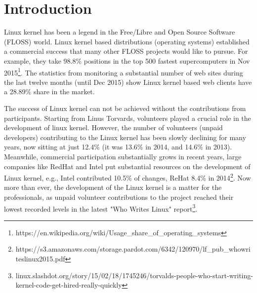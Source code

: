 \documentclass{sig-alternate-05-2015}
\begin{document}
\section{Introduction}

Linux kernel has been a legend in the Free/Libre and Open Source Software (FLOSS) world.
Linux kernel based distributions (operating systems) established a commercial success
that many other FLOSS projects would like to pursue.
For example, they take 98.8\% positions in the top 500 fastest supercomputers 
in Nov 2015\footnote{https://en.wikipedia.org/wiki/Usage\_share\_of\_operating\_systems}.
The statistics from monitoring a substantial number of web sites during the 
last twelve months (until Dec 2015) show Linux kernel based
web clients have a 28.89\% share in the market.

The success of Linux kernel can not be achieved without the contributions
from participants. Starting from Linus Torvards,  volunteers
played a crucial role in the development of linux kernel. 
However, the number of volunteers (unpaid developers) contributing to the 
Linux kernel has been slowly declining for many years, now sitting at just 
 12.4\% (it was 13.6\% in 2014, and 14.6\% in 2013).
Meanwhile, commercial participation substantially grows in recent years,
large companies like RedHat and Intel put substantial resources on the development
of Linux kernel, e.g., Intel contributed 10.5\% of changes, ReHat 8.4\% 
in 2014\footnote{https://s3.amazonaws.com/storage.pardot.com/6342/120970/lf\_pub\_whowriteslinux2015.pdf}.
Now more than ever, the development of the Linux kernel is a matter for 
the professionals, as unpaid volunteer contributions to the project reached their 
lowest recorded levels in the latest "Who Writes Linux" 
report\footnote{linux.slashdot.org/story/15/02/18/1745246/torvalds-people-who-start-writing-kernel-code-get-hired-really-quickly}.

\end{document}
